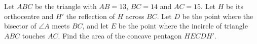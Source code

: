 Let $ABC$ be the triangle with $AB=13$, $BC=14$ and $AC=15$. Let $H$ be its orthocentre and $H'$ the reflection of $H$ across $BC$. Let $D$ be the point where the bisector of $\angle A$ meets $BC$, and let $E$ be the point where the incircle of triangle $ABC$ touches $AC$. Find the area of the concave pentagon $HECDH'$.
